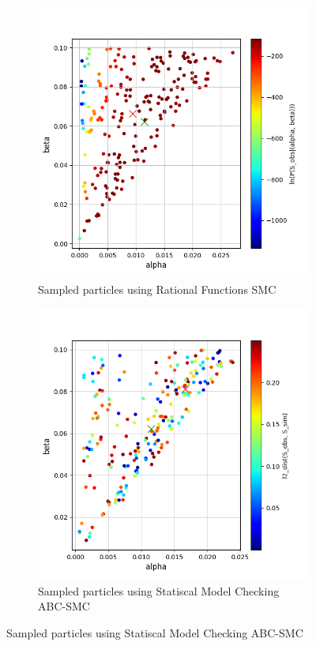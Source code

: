 \begin{figure}[H]
    \centering
    \begin{subfigure}{0.48\textwidth}
        \centering
        \includegraphics[width=\linewidth]{figures/sir1510_rfsmc_few.png}
        \caption{Sampled particles using Rational Functions SMC}
    \end{subfigure}
    \hfill
    \begin{subfigure}{0.48\textwidth}
        \centering
        \includegraphics[width=\linewidth]{figures/sir1510_abcsmc_few.png}
        \caption{Sampled particles using Statiscal Model Checking ABC-SMC}
    \end{subfigure}
\end{figure}

